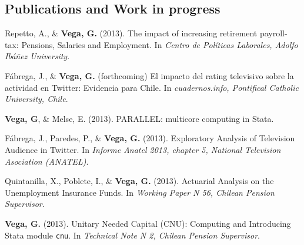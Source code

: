 \documentclass[letterpaper, 12pt]{article}
\renewenvironment{itemize}{
  \begin{list}{}{
    \setlength{\leftmargin}{0.45cm}
  }
}{
  \end{list}
}
\begin{document}
\subsection*{Publications and Work in progress}
\begin{itemize}
\item Repetto, A., \& {\bf Vega, G.} (2013). The impact of increasing retirement payroll-tax: Pensions, Salaries and Employment. In {\it Centro de Pol\'iticas Laborales, Adolfo Ib\'a\~nez University}.
\item F\'abrega, J., \& {\bf Vega, G.} (forthcoming) El impacto del rating televisivo sobre la actividad en Twitter: Evidencia para Chile. In {\it cuadernos.info, Pontifical Catholic University, Chile}.
\item {\bf Vega, G}, \& Melse, E. (2013). PARALLEL: multicore computing in Stata.
\item F\'abrega, J., Paredes, P., \& {\bf Vega, G.} (2013). Exploratory Analysis of Television Audience in Twitter. In {\it Informe Anatel 2013, chapter 5, National Television Asociation (ANATEL)}.
\item Quintanilla, X., Poblete, I., \& {\bf Vega, G.} (2013). Actuarial Analysis on the Unemployment Insurance Funds. In {\it Working Paper N 56, Chilean Pension Supervisor}.
\item {\bf Vega, G.} (2013). Unitary Needed Capital (CNU): Computing and Introducing Stata module {\tt cnu}. In {\it Technical Note N 2, Chilean Pension Supervisor}.
\end{itemize}
\end{document}
